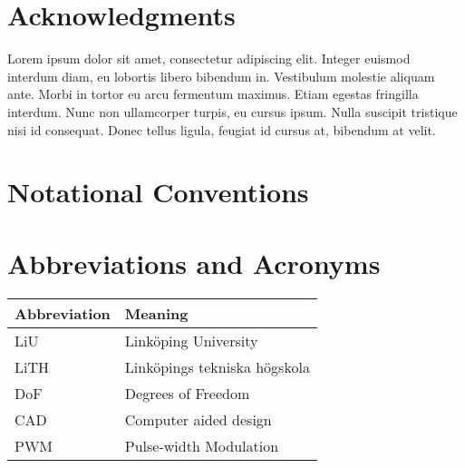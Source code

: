 \documentclass[11pt,a4paper,twoside]{article}
\begin{document}
\clearpage
\thispagestyle{empty}
\cleardoublepage
\thispagestyle{plain}


\section*{Acknowledgments}

Lorem ipsum dolor sit amet, consectetur adipiscing elit. Integer euismod interdum diam, eu lobortis libero bibendum in. Vestibulum molestie aliquam ante. Morbi in tortor eu arcu fermentum maximus. Etiam egestas fringilla interdum. Nunc non ullamcorper turpis, eu cursus ipsum. Nulla suscipit tristique nisi id consequat. Donec tellus ligula, feugiat id cursus at, bibendum at velit.

\clearpage
\thispagestyle{empty}
\cleardoublepage
\thispagestyle{plain}


\section*{Notational Conventions}
\label{cha:notation}
\vspace{-2ex}


\section*{Abbreviations and Acronyms}
\vspace*{-2ex}
\begin{longtable}{p{}p{}} %

 \multicolumn{1}{l}{\bfseries Abbreviation} &
 \multicolumn{1}{l}{\bfseries Meaning}\\

\endhead
\endfoot

LiU     & Linköping University\\
LiTH	  & Linköpings tekniska högskola \\
DoF		  & Degrees of Freedom \\
CAD     & Computer aided design\\
PWM     & Pulse-width Modulation\\

\end{longtable}
\vspace*{1ex}
\end{document}
